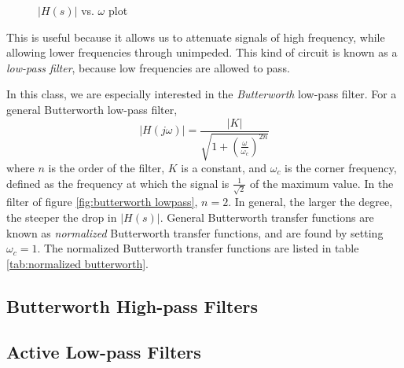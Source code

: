 \documentclass[nobib]{tufte-handout}
\begin{document}
\begin{figure}
    \begin{center}
    \end{center}
    \caption{$|H(s)|$ vs. $\omega$ plot}
    \label{fig:butterworth lowpass plot}
\end{figure}
This is useful because it allows us 
to attenuate signals of high frequency, 
while allowing lower frequencies through 
unimpeded. This kind of circuit is 
known as a \emph{low-pass filter}, 
because low frequencies are allowed 
to pass. 

In this class, we are especially interested in 
the \emph{Butterworth} low-pass 
filter. For a general Butterworth
low-pass filter, 
\begin{equation} \label{eq:butterworth}
    \lvert H(j\omega) \rvert = \frac{\lvert K \rvert}{\sqrt{1 + \left( \frac{\omega}{\omega_c} \right)^{2n}}}
\end{equation}
where $n$ is the order of the 
filter, $K$ is a constant, and 
$\omega_c$ is the corner 
frequency, defined as the 
frequency at which the signal 
is $\frac{1}{\sqrt{2}}$ of 
the maximum value. In
the filter of figure \ref{fig:butterworth lowpass},
$n = 2$. In general, the 
larger the degree, the 
steeper the drop in 
$|H(s)|$.  
General Butterworth transfer
functions are known as 
\emph{normalized} Butterworth 
transfer functions, and 
are found by setting $\omega_c = 1$.
The normalized Butterworth 
transfer functions are listed in 
table \ref{tab:normalized butterworth}.

\subsection{Butterworth High-pass Filters}

\subsection{Active Low-pass Filters}
\end{document}
